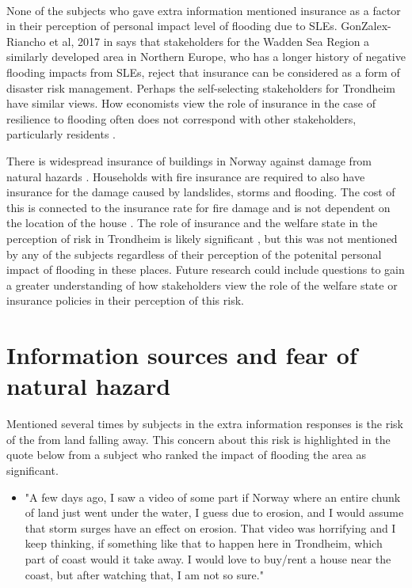 \paragraph{}
None of the subjects who gave extra information mentioned insurance as a factor in their perception of personal impact level of flooding due to SLEs. GonZalex-Riancho et al, 2017 in \cite{gerkensmeier_governing_2018} says that stakeholders for the Wadden Sea Region a similarly developed area in Northern Europe, who has a longer history of negative flooding impacts from SLEs, reject that insurance can be considered as a form of disaster risk management. Perhaps the self-selecting stakeholders for Trondheim have similar views. How economists view the role of insurance in the case of resilience to flooding often does not correspond with other stakeholders, particularly residents \cite{gerkensmeier_governing_2018}.

There is widespread insurance of buildings in Norway against damage from natural hazards \cite{lujala_role_2020}. Households with fire insurance are required to also have insurance for the damage caused by landslides, storms and flooding. The cost of this is connected to the insurance rate for fire damage and is not dependent on the location of the house \cite{lujala_role_2020}. The role of insurance and the welfare state in the perception of risk in Trondheim is likely significant \cite{lujala_role_2020}, but this was not mentioned by any of the subjects regardless of their perception of the potenital personal impact of flooding in these places. Future research could include questions to gain a greater understanding of how stakeholders view the role of the welfare state or insurance policies in their perception of this risk. 






\section{Information sources and fear of natural hazard }
Mentioned several times by subjects in the extra information responses is the risk of the from land falling away. This concern about this risk is highlighted in the quote below from a subject who ranked the impact of flooding the area as significant.

\begin{itemize}
    \item "A few days ago, I saw a video of some part if Norway where an entire chunk of land just went under the water, I guess due to erosion, and I would assume that storm surges have an effect on erosion. That video was horrifying and I keep thinking, if something like that to happen here in Trondheim, which part of coast would it take away. I would love to buy/rent a house near the coast, but after watching that, I am not so sure."
\end{itemize}
